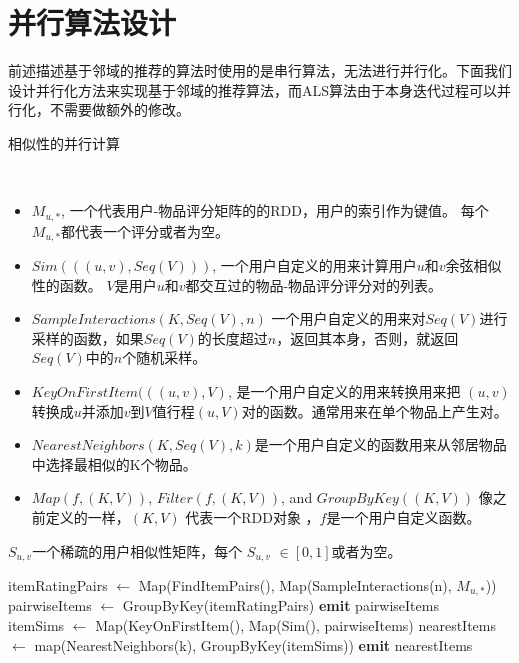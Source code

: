 \section{并行算法设计}
前述描述基于邻域的推荐的算法时使用的是串行算法，无法进行并行化。下面我们设计并行化方法来实现基于邻域的推荐算法，而ALS算法由于本身迭代过程可以并行化，不需要做额外的修改。
    \begin{algorithm}
        \caption{相似性的并行计算}
        \begin{algorithmic}[1] %
            \Require \\
            \begin{itemize} 
                \item $M_{u, *}$, 一个代表用户-物品评分矩阵的的RDD，用户的索引作为键值。 每个$M_{u,*}$都代表一个评分或者为空。
                \item $Sim(((u, v), Seq(V)))$, 一个用户自定义的用来计算用户$u$和$v$余弦相似性的函数。 $V$是用户$u$和$v$都交互过的物品-物品评分评分对的列表。
                \item $SampleInteractions(K, Seq(V), n)$ 一个用户自定义的用来对$Seq(V)$进行采样的函数，如果$Seq(V)$的长度超过$n$，返回其本身，否则，就返回$Seq(V)$中的$n$个随机采样。
                \item $KeyOnFirstItem(((u, v), V)$, 是一个用户自定义的用来转换用来把 $(u, v)$转换成$u$并添加$v$到$V$值行程$(u, V)$对的函数。通常用来在单个物品上产生对。
                \item $NearestNeighbors(K, Seq(V), k)$是一个用户自定义的函数用来从邻居物品中选择最相似的K个物品。
                \item $Map(f, (K, V))$, $Filter(f, (K, V))$, and $GroupByKey((K, V))$ 像之前定义的一样，$(K, V)$ 代表一个RDD对象 ，$f$是一个用户自定义函数。
           \end{itemize}
            \Ensure $S_{u,v}$一个稀疏的用户相似性矩阵，每个 $S_{u, v}$ $\in [0, 1]$或者为空。

            \State itemRatingPairs $\leftarrow$ Map(FindItemPairs(), Map(SampleInteractions(n), $M_{u, *}$))
            \State pairwiseItems $\leftarrow$ GroupByKey(itemRatingPairs)
            \State \textbf{emit} pairwiseItems
            \EndFunction
            \\
                \State itemSims $\leftarrow$ Map(KeyOnFirstItem(), Map(Sim(), pairwiseItems)
                \State nearestItems $\leftarrow$ map(NearestNeighbors(k), GroupByKey(itemSims))
                \State \textbf{emit} nearestItems
            \EndFunction
        \end{algorithmic}
    \end{algorithm}
    
